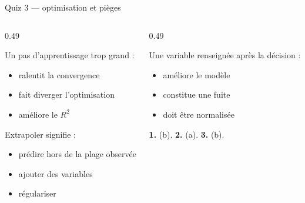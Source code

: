 \begin{frame}{Quiz 3 --- optimisation et pièges}
\begin{columns}[t]
\begin{column}{0.49\textwidth}
\begin{qbox}[Question 1]
Un pas d'apprentissage trop grand :
\begin{itemize}
  \item[(a)] ralentit la convergence
  \item[(b)] fait diverger l'optimisation
  \item[(c)] améliore le $R^2$
\end{itemize}
\end{qbox}
\begin{qbox}[Question 2]
Extrapoler signifie :
\begin{itemize}
  \item[(a)] prédire hors de la plage observée
  \item[(b)] ajouter des variables
  \item[(c)] régulariser
\end{itemize}
\end{qbox}
\end{column}
\begin{column}{0.49\textwidth}
\begin{qbox}[Question 3]
Une variable renseignée après la décision :
\begin{itemize}
  \item[(a)] améliore le modèle
  \item[(b)] constitue une fuite
  \item[(c)] doit être normalisée
\end{itemize}
\end{qbox}
\begin{solbox}[Réponses]
\textbf{1.} (b). \quad \textbf{2.} (a). \quad \textbf{3.} (b).
\end{solbox}
\end{column}
\end{columns}
\end{frame}

